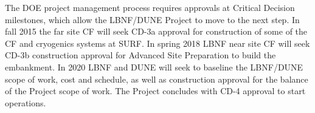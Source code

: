 The DOE project management process requires approvals at Critical Decision milestones, which allow the LBNF/DUNE Project to move to the next step. In fall 2015 the far site CF will seek CD-3a approval for construction of some of the CF and cryogenics systems at SURF. In spring 2018 LBNF near site CF will seek CD-3b construction approval for Advanced Site Preparation to build the embankment. In 2020 LBNF and DUNE will seek to baseline the LBNF/DUNE scope of work, cost and schedule, as well as construction approval for the balance of the Project scope of work. 
The Project concludes with CD-4 approval to start operations.

